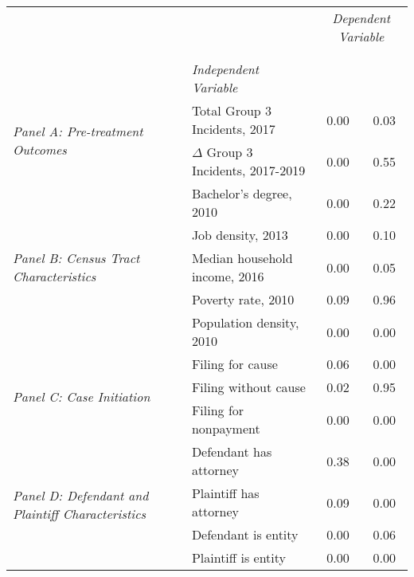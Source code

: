 \begin{tabular}{llcc}
\toprule
 &  & \multicolumn{2}{c}{\textit{Dependent Variable}} \\
\cline{3-4}
\\
 &  &  &  \\
 & \emph{Independent Variable} &  &  \\
\midrule
\multirow[c]{2}{3cm}{\textit{Panel A: Pre-treatment Outcomes}} & Total Group 3 Incidents, 2017 & 0.00 & 0.03 \\
 & $\Delta$ Group 3 Incidents, 2017-2019 & 0.00 & 0.55 \\
\cline{1-4}
\multirow[c]{5}{3cm}{\textit{Panel B: Census Tract Characteristics}} & Bachelor's degree, 2010 & 0.00 & 0.22 \\
 & Job density, 2013 & 0.00 & 0.10 \\
 & Median household income, 2016 & 0.00 & 0.05 \\
 & Poverty rate, 2010 & 0.09 & 0.96 \\
 & Population density, 2010 & 0.00 & 0.00 \\
\cline{1-4}
\multirow[c]{3}{3cm}{\textit{Panel C: Case Initiation}} & Filing for cause & 0.06 & 0.00 \\
 & Filing without cause & 0.02 & 0.95 \\
 & Filing for nonpayment & 0.00 & 0.00 \\
\cline{1-4}
\multirow[c]{4}{3cm}{\textit{Panel D: Defendant and Plaintiff Characteristics}} & Defendant has attorney & 0.38 & 0.00 \\
 & Plaintiff has attorney & 0.09 & 0.00 \\
 & Defendant is entity & 0.00 & 0.06 \\
 & Plaintiff is entity & 0.00 & 0.00 \\
\cline{1-4}
\bottomrule
\end{tabular}

